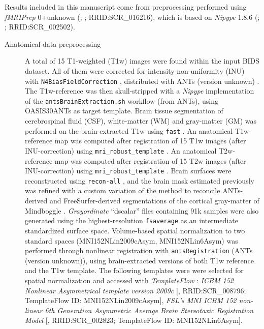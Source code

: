 \documentclass[
]{article}
\author{}
\date{}
\begin{document}
Results included in this manuscript come from preprocessing performed
using \emph{fMRIPrep} 0+unknown (\citet{fmriprep1}; \citet{fmriprep2};
RRID:SCR\_016216), which is based on \emph{Nipype} 1.8.6
(\citet{nipype1}; \citet{nipype2}; RRID:SCR\_002502).

\begin{description}
\item[Anatomical data preprocessing]
A total of 15 T1-weighted (T1w) images were found within the input BIDS
dataset. All of them were corrected for intensity non-uniformity (INU)
with \texttt{N4BiasFieldCorrection} \citep{n4}, distributed with ANTs
(version unknown) \citep[RRID:SCR\_004757]{ants}. The T1w-reference was
then skull-stripped with a \emph{Nipype} implementation of the
\texttt{antsBrainExtraction.sh} workflow (from ANTs), using OASIS30ANTs
as target template. Brain tissue segmentation of cerebrospinal fluid
(CSF), white-matter (WM) and gray-matter (GM) was performed on the
brain-extracted T1w using \texttt{fast} \citep[FSL (version unknown),
RRID:SCR\_002823,][]{fsl_fast}. An anatomical T1w-reference map was
computed after registration of 15 T1w images (after INU-correction)
using \texttt{mri\_robust\_template} \citep[FreeSurfer
7.3.2,][]{fs_template}. An anatomical T2w-reference map was computed
after registration of 15 T2w images (after INU-correction) using
\texttt{mri\_robust\_template} \citep[FreeSurfer 7.3.2,][]{fs_template}.
Brain surfaces were reconstructed using \texttt{recon-all}
\citep[FreeSurfer 7.3.2, RRID:SCR\_001847,][]{fs_reconall}, and the
brain mask estimated previously was refined with a custom variation of
the method to reconcile ANTs-derived and FreeSurfer-derived
segmentations of the cortical gray-matter of Mindboggle
\citep[RRID:SCR\_002438,][]{mindboggle}. \emph{Grayordinate} ``dscalar''
files \citep{hcppipelines} containing 91k samples were also generated
using the highest-resolution \texttt{fsaverage} as an intermediate
standardized surface space. Volume-based spatial normalization to two
standard spaces (MNI152NLin2009cAsym, MNI152NLin6Asym) was performed
through nonlinear registration with \texttt{antsRegistration} (ANTs
(version unknown)), using brain-extracted versions of both T1w reference
and the T1w template. The following templates were were selected for
spatial normalization and accessed with \emph{TemplateFlow}
\citep[23.0.0,][]{templateflow}: \emph{ICBM 152 Nonlinear Asymmetrical
template version 2009c} {[}\citet{mni152nlin2009casym},
RRID:SCR\_008796; TemplateFlow ID: MNI152NLin2009cAsym{]}, \emph{FSL's
MNI ICBM 152 non-linear 6th Generation Asymmetric Average Brain
Stereotaxic Registration Model} {[}\citet{mni152nlin6asym},
RRID:SCR\_002823; TemplateFlow ID: MNI152NLin6Asym{]}.
\end{description}
\end{document}

